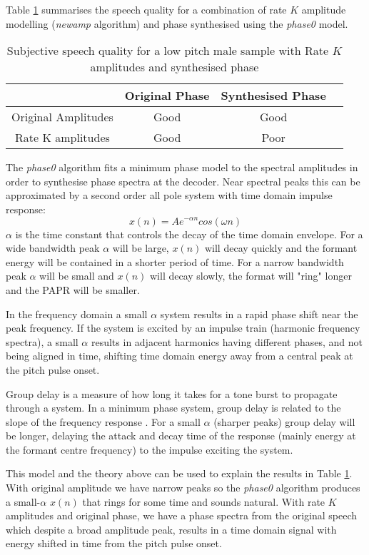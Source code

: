 \documentclass{article}
\begin{document}
Table \ref{table:ratek_phase} summarises the speech quality for a combination of rate $K$ amplitude modelling (\emph{newamp} algorithm) and phase synthesised using the \emph{phase0} model.

\begin{table}[h]
\centering
\begin{tabular}{c c c c}
 \hline
  & Original Phase & Synthesised Phase \\
 \hline
 Original Amplitudes & Good & Good \\ 
 Rate K amplitudes & Good & Poor \\
 \hline
\end{tabular}
\caption{Subjective speech quality for a low pitch male sample with Rate $K$ amplitudes and synthesised phase}
\label{table:ratek_phase}
\end{table}

The \emph{phase0} algorithm fits a minimum phase model to the spectral amplitudes in order to synthesise phase spectra at the decoder.  Near spectral peaks this can be approximated by a second order all pole system with time domain impulse response:
\begin{equation}
x(n)=Ae^{-\alpha n}cos(\omega n)
\end{equation}
$\alpha$ is the time constant that controls the decay of the time domain envelope.  For a wide bandwidth peak $\alpha$ will be large, $x(n)$ will decay quickly and the formant energy will be contained in a shorter period of time.  For a narrow bandwidth peak $\alpha$ will be small and $x(n)$ will decay slowly, the format will "ring" longer and the PAPR will be smaller.

In the frequency domain a small $\alpha$ system results in a rapid phase shift near the peak frequency. If the system is excited by an impulse train (harmonic frequency spectra), a small $\alpha$ results in adjacent harmonics having different phases, and not being aligned in time, shifting time domain energy away from a central peak at the pitch pulse onset.

Group delay is a measure of how long it takes for a tone burst to propagate through a system.  In a minimum phase system, group delay is related to the slope of the frequency response \cite{kates2005principles}.  For a small $\alpha$ (sharper peaks) group delay will be longer, delaying the attack and decay time of the response (mainly energy at the formant centre frequency) to the impulse exciting the system.

This model and the theory above can be used to explain the results in Table \ref{table:ratek_phase}.  With original amplitude we have narrow peaks so the \emph{phase0} algorithm produces a small-$\alpha$ $x(n)$ that rings for some time and sounds natural.  With rate $K$ amplitudes and original phase, we have a phase spectra from the original speech which despite a broad amplitude peak, results in a time domain signal with energy shifted in time from the pitch pulse onset.
\end{document}
